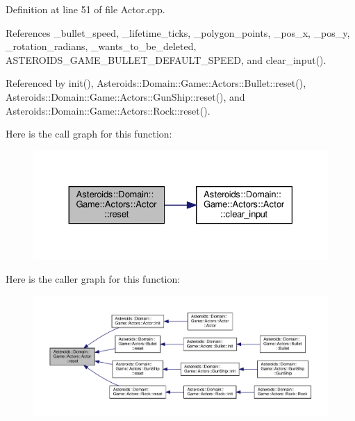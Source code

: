 Definition at line 51 of file Actor.\+cpp.



References \+\_\+bullet\+\_\+speed, \+\_\+lifetime\+\_\+ticks, \+\_\+polygon\+\_\+points, \+\_\+pos\+\_\+x, \+\_\+pos\+\_\+y, \+\_\+rotation\+\_\+radians, \+\_\+wants\+\_\+to\+\_\+be\+\_\+deleted, A\+S\+T\+E\+R\+O\+I\+D\+S\+\_\+\+G\+A\+M\+E\+\_\+\+B\+U\+L\+L\+E\+T\+\_\+\+D\+E\+F\+A\+U\+L\+T\+\_\+\+S\+P\+E\+ED, and clear\+\_\+input().



Referenced by init(), Asteroids\+::\+Domain\+::\+Game\+::\+Actors\+::\+Bullet\+::reset(), Asteroids\+::\+Domain\+::\+Game\+::\+Actors\+::\+Gun\+Ship\+::reset(), and Asteroids\+::\+Domain\+::\+Game\+::\+Actors\+::\+Rock\+::reset().

Here is the call graph for this function\+:\nopagebreak
\begin{figure}[H]
\begin{center}
\leavevmode
\includegraphics[width=330pt]{classAsteroids_1_1Domain_1_1Game_1_1Actors_1_1Actor_a538200753592ca63f7c3348fcece583f_cgraph}
\end{center}
\end{figure}
Here is the caller graph for this function\+:\nopagebreak
\begin{figure}[H]
\begin{center}
\leavevmode
\includegraphics[width=350pt]{classAsteroids_1_1Domain_1_1Game_1_1Actors_1_1Actor_a538200753592ca63f7c3348fcece583f_icgraph}
\end{center}
\end{figure}
\mbox{\label{classAsteroids_1_1Domain_1_1Game_1_1Actors_1_1Actor_a5079dbc947f23a828180242b0ff49f33}} 
